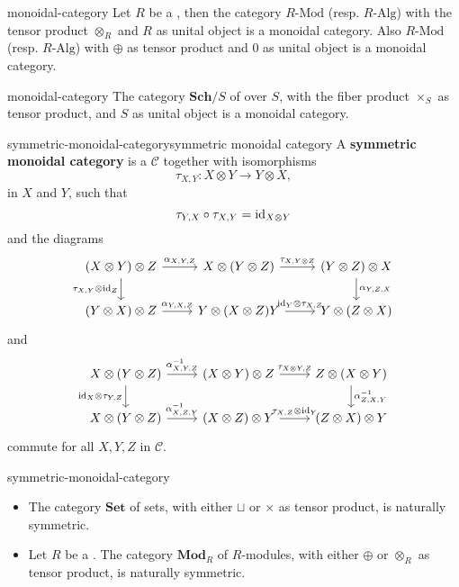 \begin{example}{monoidal-category}
    Let $R$ be a , then the category $R\text{-Mod}$ (resp. $R\text{-Alg}$) with the tensor product $\otimes_R$ and $R$ as unital object is a monoidal category. Also $R\text{-Mod}$ (resp. $R\text{-Alg}$) with $\oplus$ as tensor product and $0$ as unital object is a monoidal category.
\end{example}

\begin{example}{monoidal-category}
    The category $\textbf{Sch}/S$ of  over $S$, with the fiber product $\times_S$ as tensor product, and $S$ as unital object is a monoidal category.
\end{example}

\begin{topic}{symmetric-monoidal-category}{symmetric monoidal category}
    A \textbf{symmetric monoidal category} is a  $\mathcal{C}$ together with isomorphisms
    \[ \tau_{X, Y} \colon X \otimes Y \to Y \otimes X , \]
     in $X$ and $Y$, such that
    \[ \tau_{Y, X} \circ \tau_{X, Y} = \textup{id}_{X \otimes Y} \]
    and the diagrams
    \[ \svg \begin{tikzcd}
        (X \otimes Y) \otimes Z \arrow{r}{\alpha_{X, Y, Z}} \arrow[swap]{d}{\tau_{X, Y} \otimes \id_Z} & X \otimes (Y \otimes Z) \arrow{r}{\tau_{X, Y \otimes Z}} & (Y \otimes Z) \otimes X \arrow{d}{\alpha_{Y, Z, X}} \\ (Y \otimes X) \otimes Z \arrow{r}{\alpha_{Y, X, Z}} & Y \otimes (X \otimes Z) \arrow{r}{\id_Y \otimes \tau_{X, Z}} Y & Y \otimes (Z \otimes X)
    \end{tikzcd} \]
    and
    \[ \svg \begin{tikzcd}
        X \otimes (Y \otimes Z) \arrow{r}{\alpha^{-1}_{X, Y, Z}} \arrow[swap]{d}{\id_X \otimes \tau_{Y, Z}} & (X \otimes Y) \otimes Z \arrow{r}{\tau_{X \otimes Y, Z}} & Z \otimes (X \otimes Y) \arrow{d}{\alpha^{-1}_{Z, X, Y}} \\ X \otimes (Y \otimes Z) \arrow{r}{\alpha^{-1}_{X, Z, Y}} & (X \otimes Z) \otimes Y \arrow{r}{\tau_{X, Z} \otimes \id_Y} & (Z \otimes X) \otimes Y
    \end{tikzcd} \]
    commute for all $X, Y, Z$ in $\mathcal{C}$.
\end{topic}

\begin{example}{symmetric-monoidal-category}
    \begin{itemize}
        \item The category $\textbf{Set}$ of sets, with either $\sqcup$ or $\times$ as tensor product, is naturally symmetric.
        \item Let $R$ be a . The category $\textbf{Mod}_R$ of $R$-modules, with either $\oplus$ or $\otimes_R$ as tensor product, is naturally symmetric.
    \end{itemize}
\end{example}

